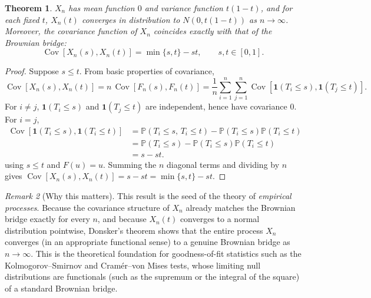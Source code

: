 \documentclass[12pt,openany]{book}
\newtheorem{theorem}{Theorem}[section]
\theoremstyle{definition}
\theoremstyle{remark}
\newtheorem{remark}[theorem]{Remark}
\newcommand{\Prob}{\mathbb{P}}
\newcommand{\ii}{\mathbf{1}}
\DeclareMathOperator{\Cov}{Cov}
\begin{document}
\begin{theorem}
$X_n$ has mean function $0$ and variance function $t(1-t)$, and for each fixed $t$, $X_n(t)$ converges in distribution to $N(0,t(1-t))$ as $n\to\infty$. Moreover, the covariance function of $X_n$ coincides \emph{exactly} with that of the Brownian bridge:
\begin{equation}
    \Cov[X_n(s),X_n(t)] = \min\{s,t\}-st, \qquad s,t\in[0,1]. \tag{18.3.16}
\end{equation}
\end{theorem}
\begin{proof}
Suppose $s\le t$. From basic properties of covariance,
\begin{equation}
    \Cov[X_n(s),X_n(t)] = n\,\Cov[F_n(s),F_n(t)] = \frac1n\sum_{i=1}^n\sum_{j=1}^n \Cov[\ii(T_i\le s),\ii(T_j\le t)]. \tag{18.3.14}
\end{equation}
For $i\ne j$, $\ii(T_i\le s)$ and $\ii(T_j\le t)$ are independent, hence have covariance $0$. For $i=j$,
\begin{equation}
    \begin{aligned}
    \Cov[\ii(T_i\le s),\ii(T_i\le t)]
    &=\Prob(T_i\le s,\,T_i\le t)
      -\Prob(T_i\le s)\Prob(T_i\le t)\\
    &=\Prob(T_i\le s)
      -\Prob(T_i\le s)\Prob(T_i\le t)\\
    &=s-st.
    \end{aligned}
    \tag{18.3.15}
\end{equation}
using $s\le t$ and $F(u)=u$. Summing the $n$ diagonal terms and dividing by $n$ gives $\Cov[X_n(s),X_n(t)] = s-st = \min\{s,t\}-st$.
\end{proof}
 
\begin{remark}[Why this matters]
This result is the seed of the theory of \emph{empirical processes}. Because the covariance structure of $X_n$ already matches the Brownian bridge exactly for every $n$, and because $X_n(t)$ converges to a normal distribution pointwise, Donsker's theorem shows that the entire process $X_n$ converges (in an appropriate functional sense) to a genuine Brownian bridge as $n\to\infty$. This is the theoretical foundation for goodness-of-fit statistics such as the Kolmogorov--Smirnov and Cram\'er--von Mises tests, whose limiting null distributions are functionals (such as the supremum or the integral of the square) of a standard Brownian bridge.
\end{remark}
 
\newpage
\end{document}
